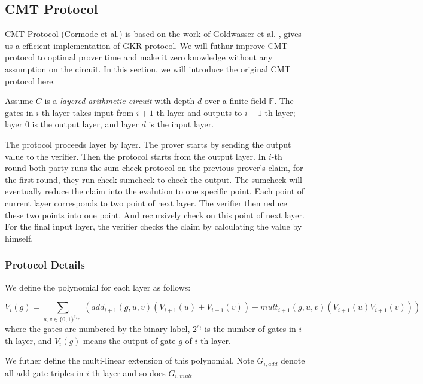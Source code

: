 
\subsection{CMT Protocol}
CMT Protocol (Cormode et al.)\cite{CMT} is based on the work of Goldwasser et al. \cite{GKR}, gives us a efficient implementation of GKR protocol. We will futhur improve CMT protocol to optimal prover time and make it zero knowledge without any assumption on the circuit. In this section, we will introduce the original CMT protocol here.

Assume $C$ is a \textit{layered arithmetic circuit} with depth $d$ over a finite field $\mathbb{F}$. The gates in $i$-th layer takes input from $i+1$-th layer and outputs to $i-1$-th layer; layer $0$ is the output layer, and layer $d$ is the input layer. 

The protocol proceeds layer by layer. The prover starts by sending the output value to the verifier. Then the protocol starts from the output layer. In $i$-th round both party runs the sum check protocol on the previous prover's claim, for the first round, they run check sumcheck to check the output. The sumcheck will eventually reduce the claim into the evalution to one specific point. Each point of current layer corresponds to two point of next layer. The verifier then reduce these two points into one point. And recursively check on this point of next layer. For the final input layer, the verifier checks the claim by calculating the value by himself.

\subsubsection{Protocol Details}
We define the polynomial for each layer as follows:
\begin{definition}
$$V_i(g)=\sum_{u, v \in \{0,1\}^{s_{i+1}}}(add_{i+1}(g,u,v)(V_{i+1}(u)+V_{i+1}(v))+mult_{i+1}(g,u,v)(V_{i+1}(u)V_{i+1}(v)))$$
where the gates are numbered by the binary label, $2^{s_i}$ is the number of gates in $i$-th layer, and $V_i(g)$ means the output of gate $g$ of $i$-th layer.
\end{definition}

We futher define the multi-linear extension of this polynomial. Note $G_{i,add}$ denote all add gate triples in $i$-th layer and so does $G_{i,mult}$

